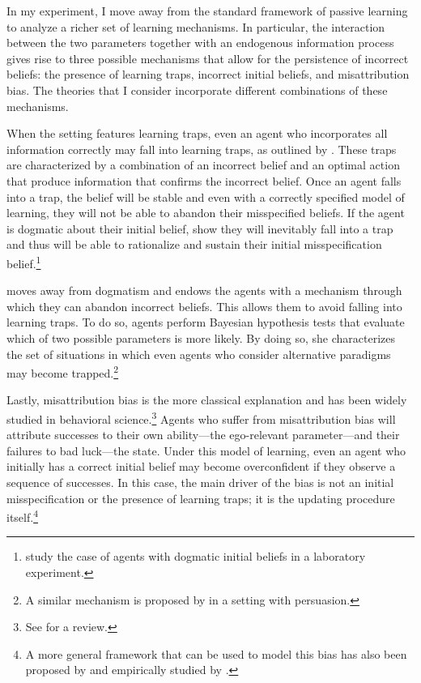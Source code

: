 \documentclass[
  12pt,
]{article}
\begin{document}
In my experiment, I move away from the standard framework of passive
learning to analyze a richer set of learning mechanisms. In particular,
the interaction between the two parameters together with an endogenous
information process gives rise to three possible mechanisms that allow
for the persistence of incorrect beliefs: the presence of learning
traps, incorrect initial beliefs, and misattribution bias. The theories
that I consider incorporate different combinations of these mechanisms.

When the setting features learning traps, even an agent who incorporates
all information correctly may fall into learning traps, as outlined by
\citet{Hestermann2021}. These traps are characterized by a combination
of an incorrect belief and an optimal action that produce information
that confirms the incorrect belief. Once an agent falls into a trap, the
belief will be stable and even with a correctly specified model of
learning, they will not be able to abandon their misspecified beliefs.
If the agent is dogmatic about their initial belief,
\citet{Heidhues2018} show they will inevitably fall into a trap and thus
will be able to rationalize and sustain their initial misspecification
belief.\footnote{\citet{Gotte2022} study the case of agents with dogmatic initial beliefs in a 
laboratory experiment.}

\citet{Ba2023} moves away from dogmatism and endows the agents with a
mechanism through which they can abandon incorrect beliefs. This allows
them to avoid falling into learning traps. To do so, agents perform
Bayesian hypothesis tests that evaluate which of two possible parameters
is more likely. By doing so, she characterizes the set of situations in
which even agents who consider alternative paradigms may become
trapped.\footnote{A similar mechanism is proposed by \citet{Schwarstein2021} in a setting with persuasion.}

Lastly, misattribution bias is the more classical explanation and has
been widely studied in behavioral
science.\footnote{See \citet{kelley1980} for a review.} Agents who
suffer from misattribution bias will attribute successes to their own
ability---the ego-relevant parameter---and their failures to bad
luck---the state. Under this model of learning, even an agent who
initially has a correct initial belief may become overconfident if they
observe a sequence of successes. In this case, the main driver of the
bias is not an initial misspecification or the presence of learning
traps; it is the updating procedure
itself.\footnote{A more general framework that can be used to model this bias has also been proposed by \citet{Brunnermeier2005} and empirically studied by \citet{Bracha2012}.}
\end{document}
